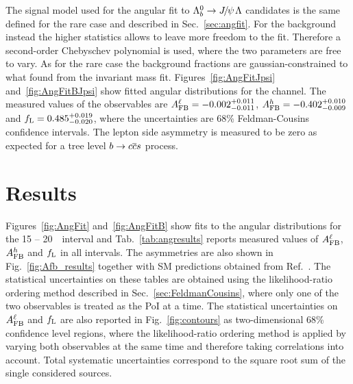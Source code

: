 %
The signal model used for the angular fit to $\Lb\to\jpsi\Lz$ candidates is the same defined
 for the rare case and described in Sec.~\ref{sec:angfit}.
For the background instead the higher statistics allows to leave more freedom to the fit.
Therefore a second-order Chebyschev polynomial is used, where the two parameters are
free to vary. As for the rare case the background fractions are gaussian-constrained
to what found from the invariant mass fit. Figures~\ref{fig:AngFitJpsi} and~\ref{fig:AngFitBJpsi} show
fitted angular distributions for the \jpsi channel. The measured values of the observables
are \mbox{$A_{\rm FB}^\ell = -0.002^{+0.011}_{-0.011}$}, $A_{\rm FB}^h = -0.402^{+0.010}_{-0.009}$
and $f_{\rm L} = 0.485^{+0.019}_{-0.020}$, where the uncertainties are 68\% Feldman-Cousins 
confidence intervals. The lepton side asymmetry is measured to be zero 
as expected for a tree level $b\rightarrow c\overline {c}s$ process.






\section{Results}
\label{sec:afb_results}

Figures~\ref{fig:AngFit} and~\ref{fig:AngFitB} show fits to the angular distributions
for the 15 -- 20~\gevgevcccc ~\qsq interval and 
%
Tab.~\ref{tab:angresults} reports measured values of $A_{\rm FB}^\ell$, $A_{\rm FB}^h$ and $f_{\rm L}$ in all intervals.
The asymmetries are also shown in Fig.~\ref{fig:Afb_results} together with SM predictions obtained from 
Ref.~\cite{Detmold:2012vy}. The statistical uncertainties on these tables 
are obtained using the likelihood-ratio ordering method described in Sec.~\ref{sec:FeldmanCousins}, where only
one of the two observables is treated as the PoI at a time. The statistical uncertainties
on $A_{\rm FB}^\ell$ and $f_{\rm L}$ are also reported in Fig.~\ref{fig:contours} as two-dimensional 68\;\% confidence level regions,
where the likelihood-ratio ordering method is applied by varying both observables at the same time and therefore taking
correlations into account. Total systematic uncertainties correspond to the square root sum of the
single considered sources.

